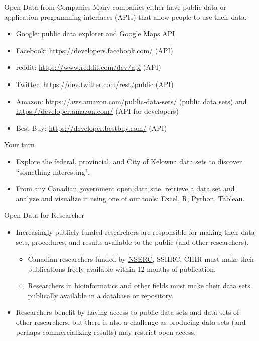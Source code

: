 \documentclass[xcolor=svgnames]{beamer}
\newcommand{\nl}{\\[1em]}
\begin{document}
\begin{frame}{Open Data from Companies}
Many companies either have public data or application programming interfaces (APIs) that allow people to use their data.
\begin{itemize}
\item Google: \href{https://www.google.com/publicdata/directory}{public data explorer} and \href{https://developers.google.com/maps}{Google Maps API}
\item Facebook: \url{https://developers.facebook.com/} (API)
\item reddit: \url{https://www.reddit.com/dev/api} (API)
\item Twitter: \url{https://dev.twitter.com/rest/public} (API)
\item Amazon: \url{https://aws.amazon.com/public-data-sets/} (public data sets) and \url{https://developer.amazon.com/} (API for developers)
\item Best Buy: \url{https://developer.bestbuy.com/} (API)
\end{itemize}
\end{frame}


\begin{frame}{Your turn}
\begin{itemize}
\item Explore the federal, provincial, and City of Kelowna data sets to discover ``something interesting".\nl %

\item From any Canadian government open data site, retrieve a data set and analyze and visualize it using one of our tools: Excel, R, Python, Tableau.

\end{itemize}
\end{frame}


\begin{frame}{Open Data for Researcher}
\begin{itemize}
\item Increasingly publicly funded researchers are responsible for making their data sets, procedures, and results available to the public (and other researchers).
\begin{itemize}
\item Canadian researchers funded by \href{http://www.nserc-crsng.gc.ca/NSERC-CRSNG/policies-politiques/OpenAccessFAQ-LibreAccesFAQ\_eng.asp}{NSERC}, SSHRC, CIHR must make their publications freely available within 12 months of publication.
\item Researchers in bioinformatics and other fields must make their data sets publically available in a database or repository.\nl
\end{itemize}

\item  Researchers benefit by having access to public data sets and data sets of other researchers, but there is also a challenge as producing data sets (and perhaps commercializing results) may restrict open access.

\end{itemize}
\end{frame}
\end{document}

